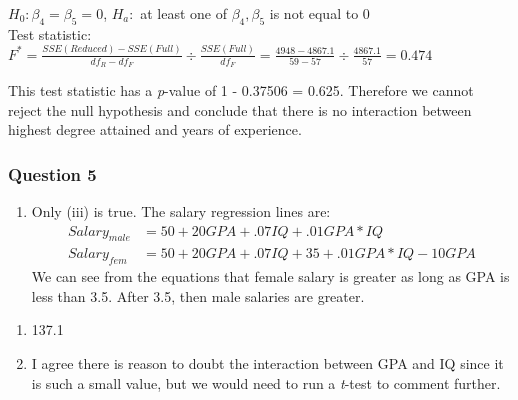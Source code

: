 \documentclass{article}
\providecommand{\tightlist}{%
      \setlength{\itemsep}{0pt}\setlength{\parskip}{0pt}}
\begin{document}
\(H_0: \beta_4 = \beta_5 = 0\), \(H_a:\) at least one of \(\beta_4, \beta_5\) is not equal to 0 \\

Test statistic: \(F^* = \frac{SSE(Reduced) - SSE(Full)}{df_R - df_F} \div \frac{SSE(Full)}{df_F} = \frac{4948 - 4867.1}{59 - 57} \div \frac{4867.1}{57} = 0.474\)

This test statistic has a \emph{p}-value of 1 - 0.37506 = 0.625.
Therefore we cannot reject the null hypothesis and conclude that there
is no interaction between highest degree attained and years of
experience.

\newpage
    \subsubsection{Question 5}\label{question-5}

\begin{enumerate}
\def\labelenumi{\alph{enumi})}
\tightlist
\item
  Only (iii) is true. The salary regression lines are:
\begin{align*}
Salary_{male} &= 50 + 20GPA + .07IQ + .01 GPA*IQ \\
Salary_{fem} &= 50 + 20GPA + .07IQ + 35 + .01 GPA*IQ - 10 GPA
\end{align*}
We can see from the equations that female salary is greater as long as
GPA is less than 3.5. After 3.5, then male salaries are greater.
\end{enumerate}

\begin{enumerate}
\def\labelenumi{\alph{enumi})}
\setcounter{enumi}{1}
\item
  137.1
\item
  I agree there is reason to doubt the interaction between GPA and IQ
  since it is such a small value, but we would need to run a
  \emph{t}-test to comment further.
\end{enumerate}


    
    
    
    
\end{document}
